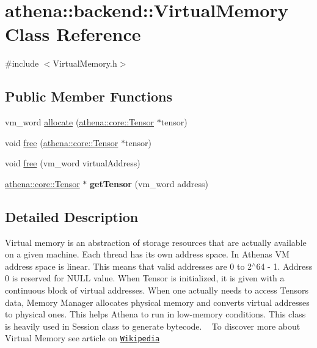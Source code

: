 \hypertarget{classathena_1_1backend_1_1_virtual_memory}{}\section{athena\+:\+:backend\+:\+:Virtual\+Memory Class Reference}
\label{classathena_1_1backend_1_1_virtual_memory}


{\ttfamily \#include $<$Virtual\+Memory.\+h$>$}

\subsection*{Public Member Functions}
\begin{DoxyCompactItemize}
\item 
vm\+\_\+word \mbox{\hyperlink{classathena_1_1backend_1_1_virtual_memory_a22be58a8e0cb574a7d46d4095cb64ac5}{allocate}} (\mbox{\hyperlink{classathena_1_1core_1_1_tensor}{athena\+::core\+::\+Tensor}} $\ast$tensor)
\item 
void \mbox{\hyperlink{classathena_1_1backend_1_1_virtual_memory_a73815358c436f8f6dd73d49d4d5d189d}{free}} (\mbox{\hyperlink{classathena_1_1core_1_1_tensor}{athena\+::core\+::\+Tensor}} $\ast$tensor)
\item 
void \mbox{\hyperlink{classathena_1_1backend_1_1_virtual_memory_ab24e17b8e8b2f8278b56b84dfdda42a3}{free}} (vm\+\_\+word virtual\+Address)
\item 
\mbox{\label{classathena_1_1backend_1_1_virtual_memory_aa85218abc6c263090922c84453adee2e}} 
\mbox{\hyperlink{classathena_1_1core_1_1_tensor}{athena\+::core\+::\+Tensor}} $\ast$ {\bfseries get\+Tensor} (vm\+\_\+word address)
\end{DoxyCompactItemize}


\subsection{Detailed Description}
Virtual memory is an abstraction of storage resources that are actually available on a given machine. Each thread has its own address space. In Athena\textquotesingle{}s VM address space is linear. This means that valid addresses are 0 to 2$^\wedge$64 -\/ 1. Address 0 is reserved for N\+U\+LL value. When Tensor is initialized, it is given with a continuous block of virtual addresses. When one actually needs to access Tensor\textquotesingle{}s data, Memory Manager allocates physical memory and converts virtual addresses to physical ones. This helps Athena to run in low-\/memory conditions. This class is heavily used in Session class to generate bytecode. ~\newline
 To discover more about Virtual Memory see article on \href{https://en.wikipedia.org/wiki/Virtual_memory}{\tt Wikipedia} 

